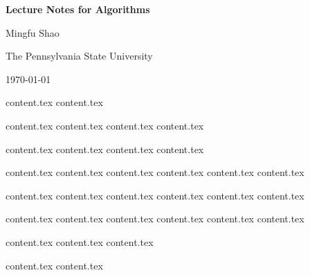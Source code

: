 \documentclass[letterpaper,11pt]{article}
\theoremstyle{mytheorem}
\begin{document}

\thispagestyle{titlestyle}
\begin{center}
\vspace*{4cm} {\huge \bf Lecture Notes for Algorithms } \vspace*{2cm}

{\large  Mingfu Shao}

{\large  The Pennsylvania State University}

{\large  \today}
\end{center}

\clearpage \newpage


\makeatletter
\renewcommand{\l@section}{\@dottedtocline{1}{0em}{5em}}
\makeatother

\thispagestyle{tablestyle}
\tableofcontents \thispagestyle{tablestyle} \clearpage \newpage

{content.tex} \clearpage\newpage
{content.tex} \clearpage\newpage

{content.tex} \clearpage\newpage
{content.tex} \clearpage\newpage
{content.tex} \clearpage\newpage
{content.tex} \clearpage\newpage

{content.tex} \clearpage\newpage
{content.tex} \clearpage\newpage
{content.tex} \clearpage\newpage
{content.tex} \clearpage\newpage

{content.tex} \clearpage\newpage
{content.tex} \clearpage\newpage
{content.tex} \clearpage\newpage
{content.tex} \clearpage\newpage
{content.tex} \clearpage\newpage
{content.tex} \clearpage\newpage

{content.tex} \clearpage\newpage
{content.tex} \clearpage\newpage
{content.tex} \clearpage\newpage
{content.tex} \clearpage\newpage
{content.tex} \clearpage\newpage
{content.tex} \clearpage\newpage

{content.tex} \clearpage\newpage
{content.tex} \clearpage\newpage
{content.tex} \clearpage\newpage
{content.tex} \clearpage\newpage
{content.tex} \clearpage\newpage
{content.tex} \clearpage\newpage

{content.tex} \clearpage\newpage
{content.tex} \clearpage\newpage
{content.tex} \clearpage\newpage

{content.tex} \clearpage\newpage
{content.tex} \clearpage\newpage
\end{document}
